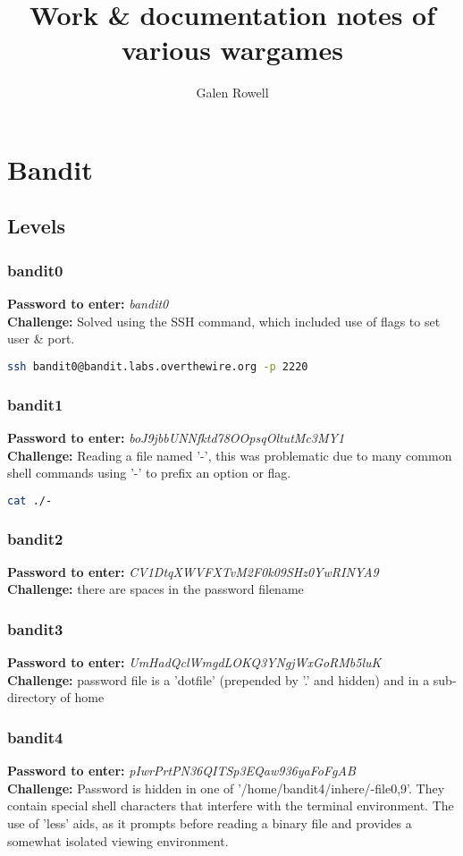 \documentclass[a4paper]{article}
\newcommand{\pass}[1]{\textbf{Password to enter:} \textit{#1}\\}
\newcommand{\chall}{\textbf{Challenge:} }
\begin{document}
\title{Work \& documentation notes of various wargames}
\author{Galen Rowell}
\maketitle


\section{Bandit}
\subsection{Levels}

\subsubsection{bandit0}
\pass{bandit0}
\chall Solved using the SSH command, which included use of flags to set user \& port.
\begin{lstlisting}[language=Bash]
ssh bandit0@bandit.labs.overthewire.org -p 2220
\end{lstlisting}

\subsubsection{bandit1}
\pass{boJ9jbbUNNfktd78OOpsqOltutMc3MY1}
\chall Reading a file named '-', this was problematic due to many common shell commands using '-' to prefix an option or flag.
\begin{lstlisting}[language=Bash]
cat ./-
\end{lstlisting}

\subsubsection{bandit2}
\pass{CV1DtqXWVFXTvM2F0k09SHz0YwRINYA9}
\chall there are spaces in the password filename

\subsubsection{bandit3}
\pass{UmHadQclWmgdLOKQ3YNgjWxGoRMb5luK}
\chall password file is a 'dotfile' (prepended by '.' and hidden) and in a sub-directory of home

\subsubsection{bandit4}
\pass{pIwrPrtPN36QITSp3EQaw936yaFoFgAB}
\chall Password is hidden in one of '/home/bandit4/inhere/-file{0,9}'. They contain special shell characters that interfere with the terminal environment. The use of 'less' aids, as it prompts before reading a binary file and provides a somewhat isolated viewing environment.
\end{document}
